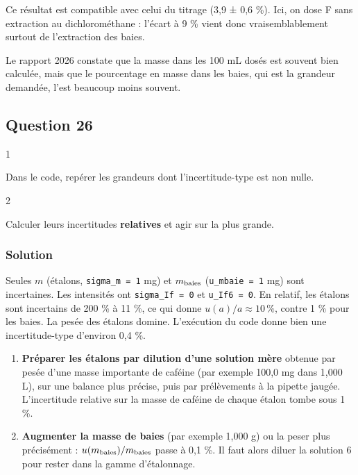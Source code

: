 \documentclass[11pt,a4paper]{article}
\providecommand{\tightlist}{\setlength{\itemsep}{0pt}\setlength{\parskip}{0pt}}
\begin{document}
Ce résultat est compatible avec celui du titrage (3,9 ± 0,6 \%). Ici, on dose F sans extraction au dichlorométhane : l'écart à 9 \% vient donc vraisemblablement surtout de l'extraction des baies.

\begin{jury}

Le rapport 2026 constate que la masse dans les 100 mL dosés est souvent bien calculée, mais que le pourcentage en masse dans les baies, qui est la grandeur demandée, l'est beaucoup moins souvent.

\end{jury}

\hypertarget{question-26}{%
\subsection{Question 26}\label{question-26}}

\begin{indication}{1}

Dans le code, repérer les grandeurs dont l'incertitude-type est non nulle.

\end{indication}

\begin{indication}{2}

Calculer leurs incertitudes \textbf{relatives} et agir sur la plus grande.

\end{indication}

\hypertarget{solution-25}{%
\subsubsection{Solution}\label{solution-25}}

Seules \(m\) (étalons, \texttt{sigma\_m\ =\ 1} mg) et \(m_{\rm baies}\) (\texttt{u\_mbaie\ =\ 1} mg) sont incertaines. Les intensités ont \texttt{sigma\_If\ =\ 0} et \texttt{u\_If6\ =\ 0}. En relatif, les étalons sont incertains de 200 \% à 11 \%, ce qui donne \(u(a)/a \approx 10\,\%\), contre 1 \% pour les baies. La pesée des étalons domine. L'exécution du code donne bien une incertitude-type d'environ 0,4 \%.

\begin{enumerate}
\def\labelenumi{\arabic{enumi}.}
\tightlist
\item
  \textbf{Préparer les étalons par dilution d'une solution mère} obtenue par pesée d'une masse importante de caféine (par exemple 100,0 mg dans 1,000 L), sur une balance plus précise, puis par prélèvements à la pipette jaugée. L'incertitude relative sur la masse de caféine de chaque étalon tombe sous 1 \%.
\item
  \textbf{Augmenter la masse de baies} (par exemple 1,000 g) ou la peser plus précisément : \(u(m_{\rm baies})/m_{\rm baies}\) passe à 0,1 \%. Il faut alors diluer la solution 6 pour rester dans la gamme d'étalonnage.
\end{enumerate}
\end{document}
